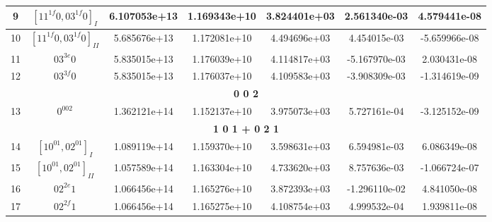 \begin{table}[h!]
\begin{tabular}{|c|c|c|c|c|c|c|}
9 & $[11^{1f}0, 03^{1f}0]_{I}$ & 6.107053e+13 & 1.169343e+10 & 3.824401e+03 & 2.561340e-03 & 4.579441e-08 \\ \hline
10 & $[11^{1f}0, 03^{1f}0]_{II}$ & 5.685676e+13 & 1.172081e+10 & 4.494696e+03 & 4.454015e-03 & -5.659966e-08 \\ \hline
11 & $03^{3e}0$ & 5.835015e+13 & 1.176039e+10 & 4.114817e+03 & -5.167970e-03 & 2.030431e-08 \\ \hline
12 & $03^{3f}0$ & 5.835015e+13 & 1.176037e+10 & 4.109583e+03 & -3.908309e-03 & -1.314619e-09 \\ \hline
\multicolumn{7}{|c|}{\textbf{0 0 2}} \\ \hline
13 & $0^002$ & 1.362121e+14 & 1.152137e+10 & 3.975073e+03 & 5.727161e-04 & -3.125152e-09 \\ \hline
\multicolumn{7}{|c|}{\textbf{1 0 1 + 0 2 1}} \\ \hline
14 & $[10^01, 02^01]_{I}$ & 1.089119e+14 & 1.159370e+10 & 3.598631e+03 & 6.594981e-03 & 6.086349e-08 \\ \hline
15 & $[10^01, 02^01]_{II}$ & 1.057589e+14 & 1.163304e+10 & 4.733620e+03 & 8.757636e-03 & -1.066724e-07 \\ \hline
16 & $02^{2e}1$ & 1.066456e+14 & 1.165276e+10 & 3.872393e+03 & -1.296110e-02 & 4.841050e-08 \\ \hline
17 & $02^{2f}1$ & 1.066456e+14 & 1.165275e+10 & 4.108754e+03 & 4.999532e-04 & 1.939811e-08 \\ \hline
\end{tabular}
\end{table}


